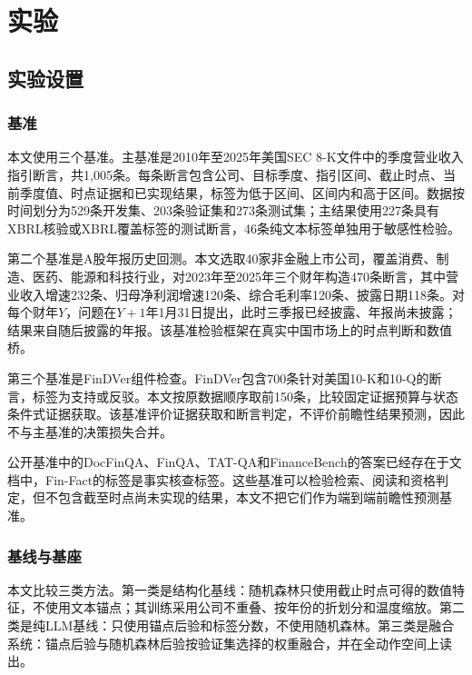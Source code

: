 \chapter{实验}
\label{ch:experiment}

\section{实验设置}

\subsection{基准}

本文使用三个基准。主基准是2010年至2025年美国SEC 8-K文件中的季度营业收入指引断言，共1,005条。每条断言包含公司、目标季度、指引区间、截止时点、当前季度值、时点证据和已实现结果，标签为低于区间、区间内和高于区间。数据按时间划分为529条开发集、203条验证集和273条测试集；主结果使用227条具有XBRL核验或XBRL覆盖标签的测试断言，46条纯文本标签单独用于敏感性检验。

第二个基准是A股年报历史回测。本文选取40家非金融上市公司，覆盖消费、制造、医药、能源和科技行业，对2023年至2025年三个财年构造470条断言，其中营业收入增速232条、归母净利润增速120条、综合毛利率120条、披露日期118条。对每个财年$Y$，问题在$Y+1$年1月31日提出，此时三季报已经披露、年报尚未披露；结果来自随后披露的年报。该基准检验框架在真实中国市场上的时点判断和数值桥。

第三个基准是FinDVer组件检查。FinDVer包含700条针对美国10-K和10-Q的断言，标签为支持或反驳。本文按原数据顺序取前150条，比较固定证据预算与状态条件式证据获取。该基准评价证据获取和断言判定，不评价前瞻性结果预测，因此不与主基准的决策损失合并。

公开基准中的DocFinQA、FinQA、TAT-QA和FinanceBench的答案已经存在于文档中，Fin-Fact的标签是事实核查标签。这些基准可以检验检索、阅读和资格判定，但不包含截至时点尚未实现的结果，本文不把它们作为端到端前瞻性预测基准\citep{reddy2024docfinqa,chen2021finqa,zhu2021tatqa,islam2023financebench,rangapur2025finfact}。

\subsection{基线与基座}

本文比较三类方法。第一类是结构化基线：随机森林只使用截止时点可得的数值特征，不使用文本锚点；其训练采用公司不重叠、按年份的折划分和温度缩放。第二类是纯LLM基线：只使用锚点后验和标签分数，不使用随机森林。第三类是融合系统：锚点后验与随机森林后验按验证集选择的权重融合，并在全动作空间上读出。

